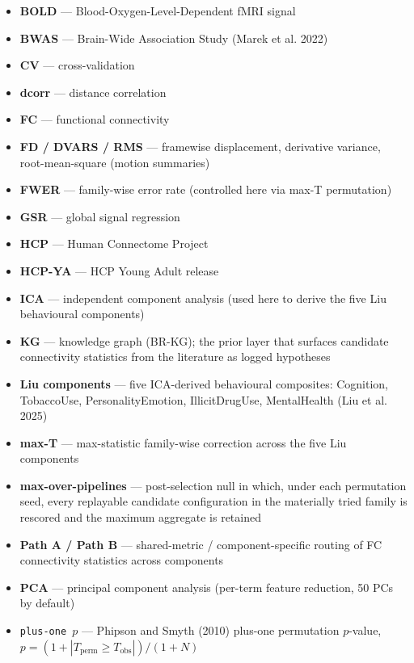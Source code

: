 \documentclass[11pt,letterpaper]{report}
\begin{document}

\begin{itemize}[leftmargin=1.6em,itemsep=0.2em]
  \item \textbf{BOLD} --- Blood-Oxygen-Level-Dependent fMRI signal
  \item \textbf{BWAS} --- Brain-Wide Association Study (Marek et al. 2022)
  \item \textbf{CV} --- cross-validation
  \item \textbf{dcorr} --- distance correlation
  \item \textbf{FC} --- functional connectivity
  \item \textbf{FD / DVARS / RMS} --- framewise displacement, derivative variance, root-mean-square (motion summaries)
  \item \textbf{FWER} --- family-wise error rate (controlled here via max-T permutation)
  \item \textbf{GSR} --- global signal regression
  \item \textbf{HCP} --- Human Connectome Project
  \item \textbf{HCP-YA} --- HCP Young Adult release
  \item \textbf{ICA} --- independent component analysis (used here to derive the five Liu behavioural components)
  \item \textbf{KG} --- knowledge graph (BR-KG); the prior layer that surfaces candidate connectivity statistics from the literature as logged hypotheses
  \item \textbf{Liu components} --- five ICA-derived behavioural composites: Cognition, TobaccoUse, PersonalityEmotion, IllicitDrugUse, MentalHealth (Liu et al. 2025)
  \item \textbf{max-T} --- max-statistic family-wise correction across the five Liu components
  \item \textbf{max-over-pipelines} --- post-selection null in which, under each permutation seed, every replayable candidate configuration in the materially tried family is rescored and the maximum aggregate is retained
  \item \textbf{Path A / Path B} --- shared-metric / component-specific routing of FC connectivity statistics across components
  \item \textbf{PCA} --- principal component analysis (per-term feature reduction, 50 PCs by default)
  \item \texttt{plus-one $p$} --- Phipson and Smyth (2010) plus-one permutation $p$-value, $p = (1 + |T_\mathrm{perm} \ge T_\mathrm{obs}|) / (1 + N)$

\end{itemize}
\end{document}

